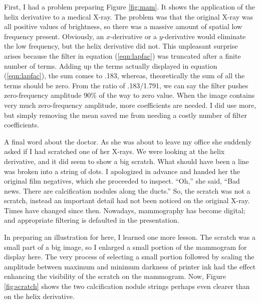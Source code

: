 \par
First, I had a problem preparing Figure \ref{fig:mam}.
It shows the application of the helix derivative
to a medical X-ray.
The problem was that the original X-ray was all positive
values of brightness, so there was a massive amount of
spatial low frequency present.
Obviously, an $x$-derivative or a $y$-derivative would
eliminate the low frequency, but the helix derivative did not.
This unpleasant surprise arises
because the filter in equation
(\ref{eqn:lapfac})
was truncated after a finite number of terms.
Adding up the terms actually displayed in equation
(\ref{eqn:lapfac}),
the sum comes to .183, whereas, theoretically the sum of all the terms should be zero.
From the ratio of .183/1.791,
we can say the filter pushes zero-frequency amplitude 90\% of the way to zero value.
When the image contains very much zero-frequency amplitude,
more coefficients are needed.
I did use more, but simply removing the mean saved me
from needing a costly number of filter coefficients.


\par
A final word about the doctor.
As she was about to leave my office she suddenly asked
if I had scratched one of her X-rays.
We were looking at the helix derivative,
and it did seem to show a big scratch.
What should have been a line was broken into a string of dots.
I apologized in advance and handed her the original film negatives,
which she proceeded to inspect.
``Oh,'' she said,
``Bad news. There are calcification nodules along the ducts.''
So, the scratch was not a scratch,
instead an important detail had not been noticed on the original X-ray.
Times have changed since then.
Nowadays, mammography has become digital;
and appropriate filtering is defaulted in the presentation.
\par
In preparing an illustration for here,
I learned one more lesson.
The scratch was a small part of a big image,
so I enlarged a small portion of the mammogram for display here.
The very process of selecting a small portion
followed by scaling the amplitude
between maximum and minimum darkness of printer ink
had the effect enhancing the visibility of the scratch on
the mammogram.
Now, Figure \ref{fig:scratch} shows the two calcification nodule strings
perhaps even clearer than on the helix derivative.






